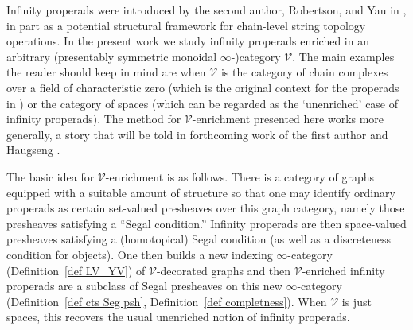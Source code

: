 \documentclass{amsart}
\numberwithin{theorem}{subsection}
\theoremstyle{definition}
\newcommand{\xV}{\mathcal{V}}
\begin{document}
Infinity properads were introduced by the second author, Robertson, and Yau in \cite{hrybook}, in part as a potential structural framework for chain-level string topology operations. 
In the present work we study infinity properads enriched in an arbitrary (presentably symmetric monoidal $\infty$-)category $\xV$. 
The main examples the reader should keep in mind are when $\xV$ is the category of chain complexes over a field of characteristic zero (which is the original context for the properads in \cite{Vallette:KDP}) or the category of spaces (which can be regarded as the `unenriched' case of infinity properads). 
The method for $\xV$-enrichment presented here works more generally, a story that will be told in forthcoming work of the first author and Haugseng \cite{patterns3}.

The basic idea for $\xV$-enrichment is as follows.
There is a category of graphs equipped with a suitable amount of structure so that one may identify ordinary properads as certain set-valued presheaves over this graph category, namely those presheaves satisfying a ``Segal condition.'' 
Infinity properads are then space-valued presheaves satisfying a (homotopical) Segal condition (as well as a discreteness condition for objects). 
One then builds a new indexing $\infty$-category (Definition~\ref{def LV_YV}) of $\xV$-decorated graphs and then $\xV$-enriched infinity properads are a subclass of Segal presheaves on this new $\infty$-category (Definition~\ref{def cts Seg psh}, Definition~\ref{def completness}). 
When $\xV$ is just spaces, this recovers the usual unenriched notion of infinity properads.
\end{document}
